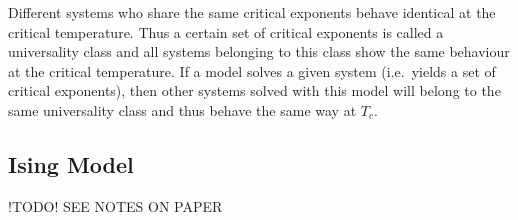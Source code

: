 \documentclass[a4paper,10pt]{article}
\numberwithin{equation}{section}
\begin{document}
\begin{multicols}{2}
Different systems who share the same critical exponents behave identical at the critical temperature.
Thus a certain set of critical exponents is called a universality class and all systems belonging to this class show the same behaviour at the critical temperature.
If a model solves a given system (i.e.\ yields a set of critical exponents), then other systems solved with this model will belong to the same universality class and thus behave the same way at $T_c$.

\subsection{Ising Model}
!TODO! SEE NOTES ON PAPER



\end{multicols}

%
%
\end{document}
